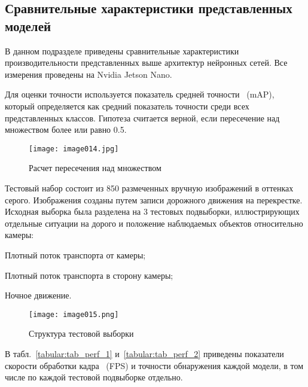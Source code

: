 \subsection{Сравнительные характеристики представленных моделей}

В данном подразделе приведены сравнительные характеристики производительности представленных выше архитектур нейронных сетей. Все измерения проведены на Nvidia Jetson Nano.

Для оценки точности используется показатель средней точности ~(mAP), который определяется как средний показатель точности среди всех представленных классов. Гипотеза считается верной, если пересечение над множеством более или равно 0.5.

\begin{figure}[htbp]
\centering
\texttt{[image: image014.jpg]}
\caption{Расчет пересечения над множеством}%
\label{fig:how-to-do-research}
\end{figure}

Тестовый набор состоит из 850 размеченных вручную изображений в оттенках серого. Изображения созданы путем записи дорожного движения на перекрестке. Исходная выборка была разделена на 3 тестовых подвыборки, иллюстрирующих отдельные ситуации на дорого и положение наблюдаемых объектов относительно камеры:
%
\begin{itemize*}
  \item Плотный поток транспорта от камеры;
  \item Плотный поток транспорта в сторону камеры;
  \item Ночное движение.
\end{itemize*}
%

\begin{figure}[htbp]
\centering
\texttt{[image: image015.png]}
\caption{Структура тестовой выборки}%
\label{fig:how-to-do-research}
\end{figure}

В табл.~\ref{tabular:tab_perf_1} и~\ref{tabular:tab_perf_2} приведены показатели скорости обработки кадра ~(FPS) и точности обнаружения каждой модели, в том числе по каждой тестовой подвыборке отдельно.

